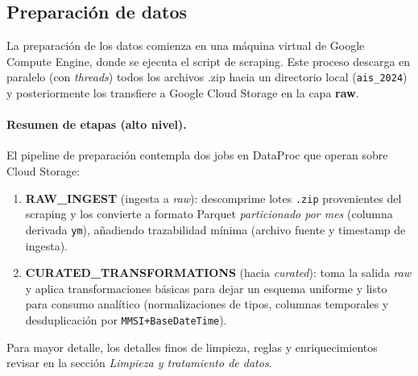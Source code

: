 \documentclass[10pt]{article}
\begin{document}
\subsection{Preparación de datos} %

La preparación de los datos comienza en una máquina virtual de Google Compute Engine, donde se ejecuta el script de scraping. Este proceso descarga en paralelo (con \textit{threads}) todos los archivos .zip hacia un directorio local (\texttt{ais\_2024}) y posteriormente los transfiere a Google Cloud Storage en la capa \textbf{raw}. 

\paragraph{Resumen de etapas (alto nivel).}
El pipeline de preparación contempla dos jobs en DataProc que operan sobre Cloud Storage:
\begin{enumerate}
  \item \textbf{RAW\_INGEST} (ingesta a \textit{raw}): descomprime lotes \texttt{.zip} provenientes del scraping y los convierte a formato Parquet \emph{particionado por mes} (columna derivada \texttt{ym}), añadiendo trazabilidad mínima (archivo fuente y timestamp de ingesta).
  \item \textbf{CURATED\_TRANSFORMATIONS} (hacia \textit{curated}): toma la salida \textit{raw} y aplica transformaciones básicas para dejar un esquema uniforme y listo para consumo analítico (normalizaciones de tipos, columnas temporales y desduplicación por \texttt{MMSI+BaseDateTime}).
\end{enumerate}
Para mayor detalle, los detalles finos de limpieza, reglas y enriquecimientos revisar en la sección \textit{Limpieza y tratamiento de datos}.
\end{document}
